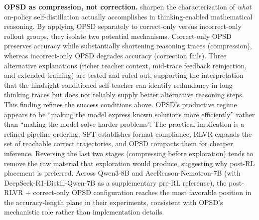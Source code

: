 \documentclass{article} %
\begin{document}
\textbf{OPSD as compression, not correction.} \citet{2605.06188} sharpen the characterization of \emph{what} on-policy self-distillation actually accomplishes in thinking-enabled mathematical reasoning. By applying OPSD separately to correct-only versus incorrect-only rollout groups, they isolate two potential mechanisms. Correct-only OPSD preserves accuracy while substantially shortening reasoning traces (compression), whereas incorrect-only OPSD degrades accuracy (correction fails). Three alternative explanations (richer teacher context, mid-trace feedback reinjection, and extended training) are tested and ruled out, supporting the interpretation that the hindsight-conditioned self-teacher can identify redundancy in long thinking traces but does not reliably supply better alternative reasoning steps. This finding refines the success conditions above. OPSD's productive regime appears to be ``making the model express known solutions more efficiently'' rather than ``making the model solve harder problems''. The practical implication is a refined pipeline ordering. SFT establishes format compliance, RLVR expands the set of reachable correct trajectories, and OPSD compacts them for cheaper inference. Reversing the last two stages (compressing before exploration) tends to remove the raw material that exploration would produce, suggesting why post-RL placement is preferred. Across Qwen3-8B and AceReason-Nemotron-7B (with DeepSeek-R1-Distill-Qwen-7B as a supplementary pre-RL reference), the post-RLVR + correct-only OPSD configuration reaches the most favorable position in the accuracy-length plane in their experiments, consistent with OPSD's mechanistic role rather than implementation details.
\end{document}
